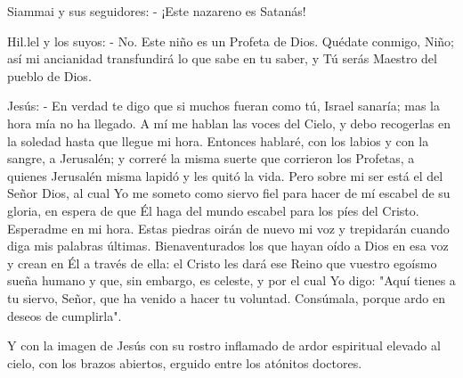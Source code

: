 \documentclass[12pt, twoside, openright]{book} %
\begin{document}
Siammai y sus seguidores: - ¡Este nazareno es Satanás! 

Hil.lel y los suyos: - No. Este niño es un Profeta de Dios. Quédate conmigo, Niño; así mi ancianidad transfundirá lo que sabe en tu saber, y Tú serás Maestro del pueblo de Dios. 

Jesús: - En verdad te digo que si muchos fueran como tú, Israel sanaría; mas la hora mía no ha llegado. A mí me hablan las voces del Cielo, y debo recogerlas en la soledad hasta que llegue mi hora. Entonces hablaré, con los labios y con la sangre, a Jerusalén; y correré la misma suerte que corrieron los Profetas, a quienes Jerusalén misma lapidó y les quitó la vida. Pero sobre mi ser está el del Señor Dios, al cual Yo me someto como siervo fiel para hacer de mí escabel de su gloria, en espera de que Él haga del mundo escabel para los píes del Cristo. Esperadme en mi hora. Estas piedras oirán de nuevo mi voz y trepidarán cuando diga mis palabras últimas. Bienaventurados los que hayan oído a Dios en esa voz y crean en Él a través de ella: el Cristo les dará ese Reino que vuestro egoísmo sueña humano y que, sin embargo, es celeste, y por el cual Yo digo: "Aquí tienes a tu siervo, Señor, que ha venido a hacer tu voluntad. Consúmala, porque ardo en deseos de cumplirla". 

Y con la imagen de Jesús con su rostro inflamado de ardor espiritual elevado al cielo, con los brazos abiertos, erguido entre los atónitos doctores. 
\end{document}
